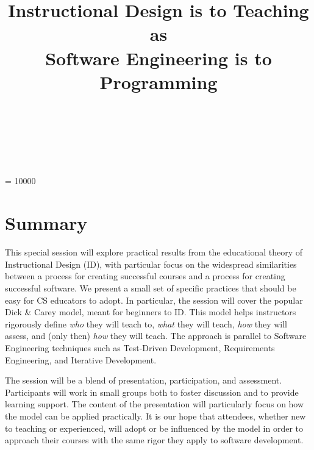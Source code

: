 \documentclass{sig-alternate}
\begin{document}

\widowpenalty = 10000

\title{Instructional Design is to Teaching as\\Software Engineering is to Programming}
\author{
	\\
	\\
    \\
}

\maketitle




\section{Summary}

This special session will explore practical results from 
the educational theory of Instructional Design (ID), with particular focus on the widespread similarities between a process for creating successful courses and a process for creating successful software.
We present a small set of specific practices that should be easy for CS educators to adopt.
In particular, the session will cover the popular Dick \& Carey model, meant for beginners to ID.
This model helps instructors rigorously define \textit{who} they will teach to, \textit{what} they will teach, \textit{how} they will assess, and (only then) \textit{how} they will teach.
The approach is parallel to Software Engineering techniques such as Test-Driven Development, Requirements Engineering, and Iterative Development.

The session will be a blend of presentation, participation, and assessment.
Participants will work in small groups both to foster discussion and to provide learning support.
The content of the presentation will particularly focus on how the model can be applied practically.
It is our hope that attendees, whether new to teaching or experienced, will adopt or be influenced by the model in order to approach their courses with the same rigor they apply to software development.
\end{document}

